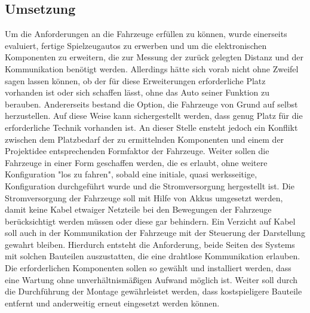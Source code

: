 \documentclass[.../Dokumentation.tex]{subfiles}
\begin{document}
\subsection{Umsetzung}\label{sec-concept-execution}
Um die Anforderungen an die Fahrzeuge erfüllen zu können, wurde 
einerseits evaluiert, fertige Spielzeugautos zu erwerben und um die 
elektronischen Komponenten zu erweitern, die zur Messung der zurück gelegten 
Distanz und der Kommunikation benötigt werden. Allerdings hätte sich vorab 
nicht ohne Zweifel sagen lassen können, ob der für diese Erweiterungen 
erforderliche Platz vorhanden ist oder sich schaffen lässt, ohne das Auto 
seiner Funktion zu berauben. 
Andererseits bestand die Option, die Fahrzeuge von 
Grund auf selbst herzustellen. 
Auf diese Weise kann sichergestellt werden, 
dass genug Platz für die erforderliche Technik vorhanden ist.
An dieser Stelle ensteht jedoch ein Konflikt zwischen dem Platzbedarf der zu 
ermittelnden Komponenten und 
einem der Projektidee entsprechenden Formfaktor der Fahrzeuge.
Weiter sollen die Fahrzeuge in einer Form geschaffen werden, die es erlaubt, 
ohne weitere Konfiguration "los zu fahren", sobald eine initiale, 
quasi werksseitige, Konfiguration durchgeführt wurde und die Stromversorgung 
hergestellt ist. 
Die Stromversorgung der Fahrzeuge soll mit Hilfe von Akkus umgesetzt werden, 
damit keine Kabel etwaiger Netzteile bei den Bewegungen der Fahrzeuge 
berücksichtigt werden müssen oder diese gar behindern.
Ein Verzicht auf Kabel soll auch in der Kommunikation der Fahrzeuge mit 
der Steuerung der Darstellung gewahrt bleiben.
Hierdurch entsteht die Anforderung, beide Seiten des Systems mit solchen 
Bauteilen auszustatten, die eine drahtlose Kommunikation erlauben.
Die erforderlichen Komponenten sollen so gewählt und installiert werden, 
dass eine Wartung ohne unverhältnismäßigen Aufwand möglich ist. Weiter soll 
durch die Durchführung der Montage gewährleistet werden, dass kostspieligere 
Bauteile entfernt und anderweitig erneut eingesetzt werden können.
\end{document}
